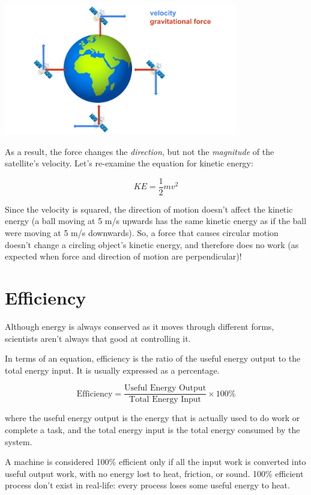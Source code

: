 \begin{center}
\includegraphics[width=4in]{satellite.png}
\end{center}

As a result, the force changes the \textit{direction}, but not the 
\textit{magnitude} of the satellite's velocity. Let's re-examine the equation 
for kinetic energy:

$$KE = \frac{1}{2}mv^2$$

Since the velocity is squared, the direction of motion doesn't affect the kinetic 
energy (a ball moving at 5 m/s upwards has the same kinetic energy as if the ball 
were moving at 5 m/s downwards). So, a force that causes circular motion doesn't 
change a circling object's kinetic energy, and therefore does no work (as 
expected when force and direction of motion are perpendicular)!

\section{Efficiency}
Although energy is always conserved as it moves through different forms, 
scientists aren't always that good at controlling it.

In terms of an equation, efficiency is the ratio of the useful energy output to 
the total energy input. It is usually expressed as a percentage.
\begin{mdframed}[style=important, frametitle={Formula for Efficiency}]
\[
\text{Efficiency} = \frac{\text{Useful Energy Output}}{\text{Total Energy Input}} 
\times 100\%
\]
\end{mdframed}
where the useful energy output is the energy that is actually used to do work or 
complete a task, and the total energy input is the total energy consumed by the 
system.

A machine is considered 100\% efficient only if all the input work is converted 
into useful output work, with no energy lost to heat, friction, or sound. 100\% 
efficient process don't exist in real-life: every process loses some useful 
energy to heat. 

